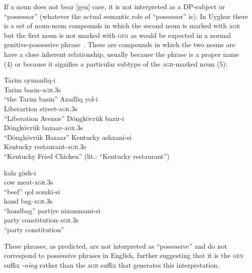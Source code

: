 \documentclass[letterpaper,12pt]{article}
\newcommand{\poss}[2]{\textsc{agr}.{\footnotesize #1}#2}
\newcommand{\posst}{\textsc{agr}}
\newcommand{\gen}{\textsc{gen}}
\begin{document}
If a noun does not bear [gen] case, it is not interpreted as a DP-subject or ``possessor'' (whatever the actual semantic role of ``possessor'' is). In Uyghur there is a set of noun-noun compounds in which the second noun is marked with \posst{} but the first noun is not marked
with \gen{} as would be expected in a normal genitive-possessive phrase~\cite[pp. 41--2]{deJong}. These are compounds in which the two nouns
are have a close inherent relationship, usually because the phrase is a proper name (4) or because it signifies a particular subtype of the \posst{}-marked
noun (5):
\begin{exe}
\ex
	\begin{xlist}
	\ex \gll Tarim oymanliq-i\\
					 Tarim	basin-\poss{3}{s}\\
			\glt ``the Tarim basin''
	\ex \gll Azadliq yol-i\\
					 Liberartion street-\poss{3}{s}\\
			\glt ``Liberation Avenue''
	\ex \gll D\"ongk\"ovr\"uk bazir-i\\
					 D\"ongk\"ovr\"uk bazaar-\poss{3}{s}\\
			\glt ``D\"ongk\"ovr\"uk Bazaar''
	\ex \gll Kentucky ashxani-si\\
					 Kentucky restaurant-\poss{3}{s}\\
			\glt ``Kentucky Fried Chicken'' (lit.: ``Kentucky restaurant'')
	\end{xlist}
\ex
	\begin{xlist}
	\ex	\gll kala g\"osh-i\\
			cow meat-\poss{3}{s}\\
			\glt ``beef''
	\ex	\gll qol somki-si\\
			     hand bag-\poss{3}{s}\\
			\glt ``handbag''
	\ex \gll partiye nizamnami-si\\
					 party   constitution-\poss{3}{s}\\
			\glt ``party constitution''
	\end{xlist}
\end{exe} 
These phrases, as predicted, are not interpreted as ``possessive'' and do not correspond to possessive phrases in English, further suggesting that it is the
\gen{} suffix \textsl{-ning} rather than the \posst{} suffix that generates this interpretation.
					 
\end{document}
